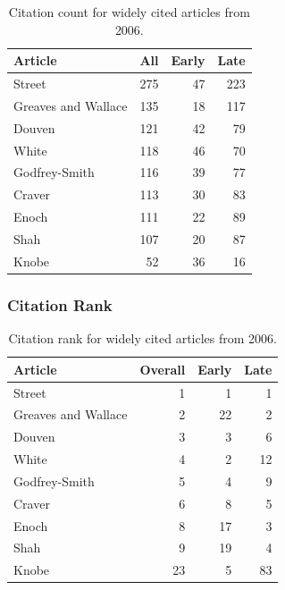 \documentclass[
  10pt,
  letterpaper,
  DIV=11,
  numbers=noendperiod,
  twoside]{scrartcl}
\begin{document}
\begin{longtable}[]{@{}lrrr@{}}

\caption{\label{tbl-citation-count-2006}Citation count for widely cited
articles from 2006.}

\tabularnewline

\toprule\noalign{}
Article & All & Early & Late \\
\midrule\noalign{}
\endhead
\bottomrule\noalign{}
\endlastfoot
Street & 275 & 47 & 223 \\
Greaves and Wallace & 135 & 18 & 117 \\
Douven & 121 & 42 & 79 \\
White & 118 & 46 & 70 \\
Godfrey-Smith & 116 & 39 & 77 \\
Craver & 113 & 30 & 83 \\
Enoch & 111 & 22 & 89 \\
Shah & 107 & 20 & 87 \\
Knobe & 52 & 36 & 16 \\

\end{longtable}

\subsubsection*{Citation Rank}\label{sec-rank-2006}

\begin{longtable}[]{@{}lrrr@{}}

\caption{\label{tbl-citation-rank-2006}Citation rank for widely cited
articles from 2006.}

\tabularnewline

\toprule\noalign{}
Article & Overall & Early & Late \\
\midrule\noalign{}
\endhead
\bottomrule\noalign{}
\endlastfoot
Street & 1 & 1 & 1 \\
Greaves and Wallace & 2 & 22 & 2 \\
Douven & 3 & 3 & 6 \\
White & 4 & 2 & 12 \\
Godfrey-Smith & 5 & 4 & 9 \\
Craver & 6 & 8 & 5 \\
Enoch & 8 & 17 & 3 \\
Shah & 9 & 19 & 4 \\
Knobe & 23 & 5 & 83 \\

\end{longtable}
\end{document}
